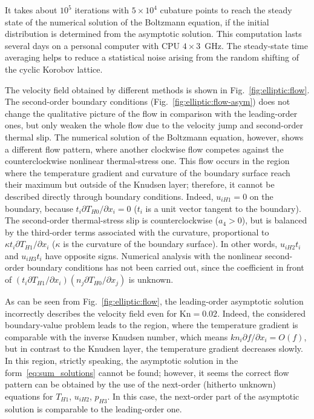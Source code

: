 \documentclass[10pt]{article}
\newcommand{\Kn}{\mathrm{Kn}}
\newcommand{\Pder}[2][]{\partial#1/\partial#2}
\newcommand{\OO}[1]{O(#1)}
\begin{document}
It takes about \(10^5\) iterations with \(5\times 10^4\) cubature points to reach the steady state
of the numerical solution of the Boltzmann equation,
if the initial distribution is determined from the asymptotic solution.
This computation lasts several days on a personal computer with CPU \(4\times3\)~GHz.
The steady-state time averaging helps to reduce a statistical noise
arising from the random shifting of the cyclic Korobov lattice.

The velocity field obtained by different methods is shown in Fig.~\ref{fig:elliptic:flow}.
The second-order boundary conditions (Fig.~\ref{fig:elliptic:flow-asym})
does not change the qualitative picture of the flow in comparison with the leading-order ones,
but only weaken the whole flow due to the velocity jump and second-order thermal slip.
The numerical solution of the Boltzmann equation, however, shows a different flow pattern,
where another clockwise flow competes against the counterclockwise nonlinear thermal-stress one.
This flow occurs in the region where the temperature gradient and curvature of the boundary surface reach their maximum
but outside of the Knudsen layer; therefore, it cannot be described directly through boundary conditions.
Indeed, \(u_{iH1}=0\) on the boundary, because \(t_i\Pder[T_{H0}]{x_i}=0\) (\(t_i\) is a unit vector tangent to the boundary).
The second-order thermal-stress slip is counterclockwise (\(a_4>0\)),
but is balanced by the third-order terms associated with the curvature, proportional to \(\kappa t_i\Pder[T_{H1}]{x_i}\)
(\(\kappa\) is the curvature of the boundary surface).
In other words, \(u_{iH2}t_i\) and \(u_{iH3}t_i\) have opposite signs.
Numerical analysis with the nonlinear second-order boundary conditions has not been carried out,
since the coefficient in front of \((t_i\Pder[T_{H1}]{x_i})(n_j\Pder[T_{H0}]{x_j})\) is unknown.

As can be seen from Fig.~\ref{fig:elliptic:flow},
the leading-order asymptotic solution incorrectly describes the velocity field even for \(\Kn=0.02\).
Indeed, the considered boundary-value problem leads to the region,
where the temperature gradient is comparable with the inverse Knudsen number,
which means \(kn_i\Pder[f]{x_i} = \OO{f}\), but in contrast to the Knudsen layer,
the temperature gradient decreases slowly.
In this region, strictly speaking, the asymptotic solution in the form~\eqref{eq:sum_solutions} cannot be found;
however, it seems the correct flow pattern can be obtained by the use
of the next-order (hitherto unknown) equations for \(T_{H1}\), \(u_{iH2}\), \(p_{H3}\).
In this case, the next-order part of the asymptotic solution is comparable to the leading-order one.
\end{document}
